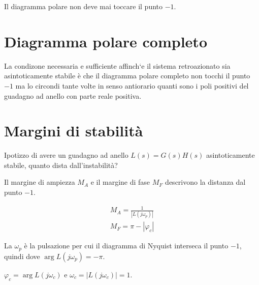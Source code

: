 Il diagramma polare non deve mai toccare il punto $-1$.


\section{Diagramma polare completo}
La condizone necessaria e sufficiente affinch`e il sistema retroazionato
sia asintoticamente stabile \`e che il diagramma polare completo non tocchi il punto $-1$ ma lo circondi 
tante volte in senso antiorario quanti sono i poli positivi del guadagno ad anello con 
parte reale positiva.

\section{Margini di stabilit\`a}


Ipotizzo di avere un guadagno ad anello $L(s) = G(s)H(s)$ asintoticamente stabile,
quanto dista dall'instabilit\`a?

Il margine di ampiezza $M_A$ e il margine di fase $M_F$ descrivono la distanza dal punto $-1$.

\begin{align}
  M_A = \frac{1}{|L(j\omega_p)|} \\
  M_F = \pi - | \varphi_c |
\end{align}

La $\omega_p$ \`e la pulsazione per cui il diagramma di Nyquist interseca il punto $-1$, quindi dove $\arg L(j\omega_p) = -\pi$.


$\varphi_c = \arg L(j\omega_c)$ e $\omega_c = |L(j\omega_c)| = 1$.
